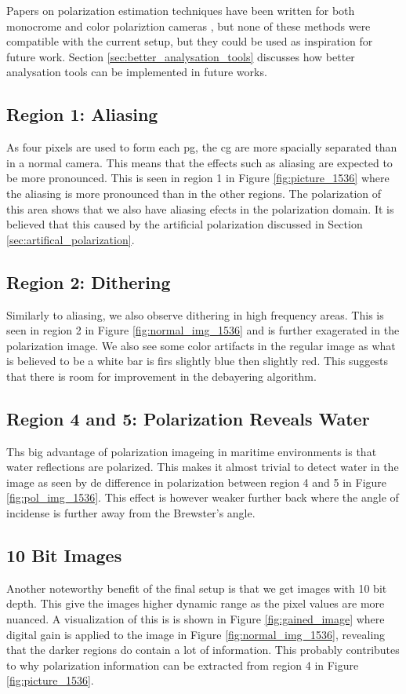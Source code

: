 Papers on polarization estimation techniques have been written for both monocrome and color polariztion cameras  \cite{mihoubiSurveyDemosaickingMethods2018} \cite{spoteJointDemosaicingColour2021}, but
none of these methods were compatible with the current setup, but they could be used as inspiration for future work.
Section \ref{sec:better_analysation_tools} discusses how better analysation tools can be implemented in future works.

\subsection{Region 1: Aliasing}
As four pixels are used to form each \gls{pg}, the \gls{cg} are more spacially separated than in a normal camera.
This means that the effects such as aliasing are expected to be more pronounced.
This is seen in region 1 in Figure \ref{fig:picture_1536} where the aliasing is more pronounced than in the other regions.
The polarization of this area shows that we also have aliasing efects in the polarization domain.
It is believed that this caused by the artificial polarization discussed in Section \ref{sec:artifical_polarization}.

\subsection{Region 2: Dithering}
Similarly to aliasing, we also observe dithering in high frequency areas.
This is seen in region 2 in Figure \ref{fig:normal_img_1536} and is further exagerated in the polarization image.
We also see some color artifacts in the regular image as what is believed to be a white bar is firs slightly blue then slightly red.
This suggests that there is room for improvement in the debayering algorithm.

\subsection{Region 4 and 5: Polarization Reveals Water}
Ths big advantage of polarization imageing in maritime environments is that water reflections are polarized.
This makes it almost trivial to detect water in the image as seen by de difference in polarization between region 4 and 5 in Figure \ref{fig:pol_img_1536}.
This effect is however weaker further back where the angle of incidense is further away from the Brewster's angle.


\subsection{10 Bit Images}
Another noteworthy benefit of the final setup is that we get images with 10 bit depth.
This give the images higher dynamic range as the pixel values are more nuanced.
A visualization of this is is shown in Figure \ref{fig:gained_image} where digital gain is applied to the image in Figure \ref{fig:normal_img_1536}, revealing that the darker regions do contain a lot of information.
This probably contributes to why polarization information can be extracted from region 4 in Figure \ref{fig:picture_1536}.

